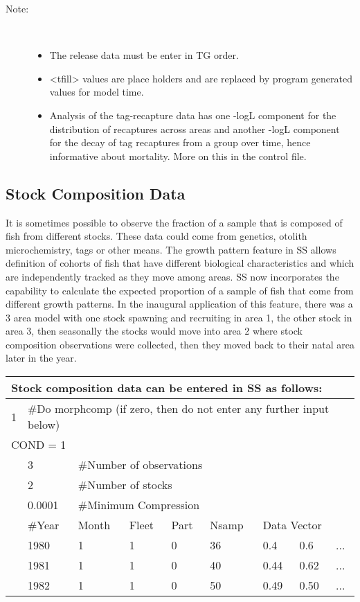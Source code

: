 \begin{description}
	\item[Note:]\
	\begin{itemize}
		\item The release data must be enter in TG order.
		\item <tfill> values are place holders and are replaced by program generated values for model time.
		\item Analysis of the tag-recapture data has one -logL component for the distribution of recaptures across areas and another -logL component for the decay of tag recaptures from a group over time, hence informative about mortality.  More on this in the control file.
	\end{itemize}
\end{description}

\subsection{Stock Composition Data}
It is sometimes possible to observe the fraction of a sample that is composed of fish from different stocks.  These data could come from genetics, otolith microchemistry, tags or other means.  The growth pattern feature in SS allows definition of cohorts of fish that have different biological characteristics and which are independently tracked as they move among areas.  SS now incorporates the capability to calculate the expected proportion of a sample of fish that come from different growth patterns.  In the inaugural application of this feature, there was a 3 area model with one stock spawning and recruiting in area 1, the other stock in area 3, then seasonally the stocks would move into area 2 where stock composition observations were collected, then they moved back to their natal area later in the year.

\begin{center}
	\begin{tabular}{p{1.1cm} p{1.1cm} p{1.1cm} p{1.1cm} p{1.1cm} p{1.1cm} p{1.1cm} p{1.1cm} p{3.5cm}}
		\multicolumn{9}{l}{Stock composition data can be entered in SS as follows:}\\
		\hline
		1 &  \multicolumn{8}{l}{\#Do morphcomp (if zero, then do not enter any further input below)}\\
		\hline
		\multicolumn{9}{l}{COND = 1}\\ 
		& 3 & \multicolumn{7}{l}{\#Number of observations}\\
		\hline
		& 2 & \multicolumn{7}{l}{\#Number of stocks}\\
		\hline
		& 0.0001 & \multicolumn{7}{l}{\#Minimum Compression}\\
		\hline
		& \#Year & Month & Fleet & Part & Nsamp & \multicolumn{3}{l}{Data Vector} \\
		\hline
		& 1980 & 1 & 1 & 0 & 36 & 0.4 & 0.6 & ...\\
		& 1981 & 1 & 1 & 0 & 40 & 0.44 & 0.62 & ...\\
		& 1982 & 1 & 1 & 0 & 50 & 0.49 & 0.50 & ...\\
		\hline
	\end{tabular}
\end{center}

